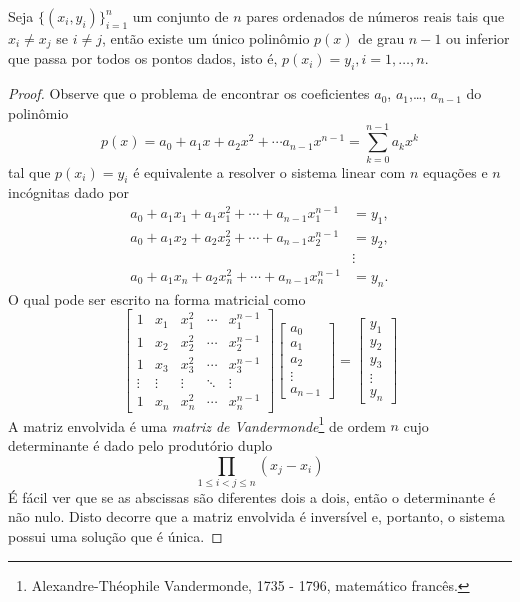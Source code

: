 \begin{teo}\label{teo:interp_poli} Seja $\{(x_i,y_i)\}_{i=1}^{n}$ um conjunto de $n$ pares ordenados de números reais tais que $x_i \ne x_j$ se $i\ne j$, então existe um único polinômio $p(x)$ de grau $n-1$ ou inferior que passa por todos os pontos dados, isto é, $p(x_i)=y_i, i=1,\ldots, n$.
\end{teo}
\begin{proof} Observe que o problema de encontrar os coeficientes $a_0$, $a_1$,\ldots, $a_{n-1}$ do polinômio
\begin{equation} p(x)=a_0+a_1x+a_2x^2+\cdots a_{n-1}x^{n-1}=\sum_{k=0}^{n-1} a_k x^k \end{equation}
tal que $p(x_i)=y_i$ é equivalente a resolver o sistema linear com $n$ equações e $n$ incógnitas dado por
\begin{equation}
  \begin{split}
    a_0+a_1x_1+a_1x_1^2+\cdots +a_{n-1} x_1^{n-1} &= y_1,\\
    a_0+a_1x_2+a_2x_2^2+\cdots +a_{n-1} x_2^{n-1} &= y_2,\\
    &\vdots\\
    a_0+a_1x_n+a_2x_n^2+\cdots +a_{n-1} x_n^{n-1}&= y_n.
  \end{split}
\end{equation}
O qual pode ser escrito na forma matricial como
\begin{equation}
  \begin{bmatrix}
    1 & x_1 & x_1^2 & \cdots & x_1^{n-1}\\
    1 & x_2 & x_2^2 & \cdots & x_2^{n-1}\\
    1 & x_3 & x_3^2 & \cdots & x_3^{n-1}\\
    \vdots&\vdots&\vdots&\ddots&\vdots\\
    1 & x_n & x_n^2 & \cdots & x_n^{n-1}
  \end{bmatrix}
  \begin{bmatrix}
    a_0\\a_1\\a_2\\ \vdots \\a_{n-1}
  \end{bmatrix} =
  \begin{bmatrix}
    y_1\\y_2\\y_3\\ \vdots \\y_n
  \end{bmatrix}
\end{equation}
A matriz envolvida é uma \emph{matriz de Vandermonde}\footnote{Alexandre-Théophile Vandermonde, 1735 - 1796, matemático francês.} de ordem $n$ cujo determinante é dado pelo produtório duplo
\begin{equation} \prod_{1\leq i<j\leq n}\left(x_j-x_i\right) \end{equation}
É fácil ver que se as abscissas são diferentes dois a dois, então o determinante é não nulo. Disto decorre que a matriz envolvida é inversível e, portanto, o sistema possui uma solução que é única.
\end{proof}


